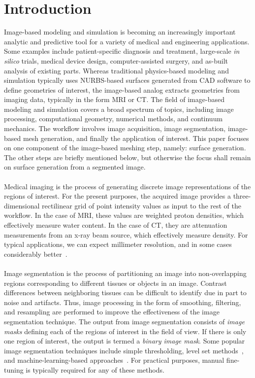 \section{Introduction}

Image-based modeling and simulation is becoming an increasingly important analytic and predictive tool for a variety of medical and engineering applications. Some examples include patient-specific diagnosis and treatment, large-scale \textit{in silico} trials, medical device design, computer-assisted surgery, and as-built analysis of existing parts. Whereas traditional physics-based modeling and simulation typically uses NURBS-based surfaces generated from CAD software to define geometries of interest, the image-based analog extracts geometries from imaging data, typically in the form MRI or CT. The field of image-based modeling and simulation covers a broad spectrum of topics, including image processing, computational geometry, numerical methods, and continuum mechanics. The workflow involves image acquisition, image segmentation, image-based mesh generation, and finally the application of interest. This paper focuses on one component of the image-based meshing step, namely: surface generation. The other steps are briefly mentioned below, but otherwise the focus shall remain on surface generation from a segmented image. \\ \\
%
Medical imaging is the process of generating discrete image representations of the regions of interest. For the present purposes, the acquired image provides a three-dimensional rectilinear grid of point intensity values as input to the rest of the workflow. In the case of MRI, these values are weighted proton densities, which effectively measure water content. In the case of CT, they are attenuation measurements from an x-ray beam source, which effectively measure density. For typical applications, we can expect millimeter resolution, and in some cases considerably better~\cite{van2012super}.\\ \\
%
Image segmentation is the process of partitioning an image into non-overlapping regions corresponding to different tissues or objects in an image. Contrast differences between neighboring tissues can be difficult to identify due in part to noise and artifacts. Thus, image processing in the form of smoothing, filtering, and resampling are performed to improve the effectiveness of the image segmentation technique. The output from image segmentation consists of \textit{image masks} defining each of the regions of interest in the field of view. If there is only one region of interest, the output is termed a \textit{binary image mask}. Some popular image segmentation techniques include simple thresholding, level set methods~\cite{malladi_1995, sethian_1996}, and machine-learning-based approaches~\cite{litjens_2017}.  For practical purposes, manual fine-tuning is typically required for any of these methods.\\ \\
